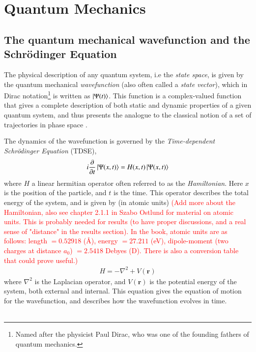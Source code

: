 \documentclass{subfiles}
\begin{document}
\section{Quantum Mechanics}
\subsection{The quantum mechanical wavefunction and the Schrödinger Equation}
The physical description of any quantum system, i.e the \emph{state space}, is given by the quantum mechanical \emph{wavefunction} (also often called a \emph{state vector})\cite{nielsen2010quantum}, which in Dirac notation\footnote{Named after the physicist Paul Dirac, who was one of the founding fathers of quantum mechanics.} is written as $\ket{\Psi(t)}$. 
This function is a complex-valued function that gives a complete description of both static and dynamic properties of a given quantum system, and thus presents the analogue to the classical notion of a set of trajectories in phase space \cite{hochstuhl2014time}. 

The dynamics of the wavefunction is governed by the \emph{Time-dependent Schrödinger Equation} (TDSE),
\begin{equation}
    i\frac{\partial}{\partial t}\ket{\Psi(x, t)} = H(x,t)\ket{\Psi(x, t)}\label{eq:tdse}
\end{equation}
where $H$ a linear hermitian operator often referred to as the \emph{Hamiltonian}. Here $x$ is the position of the particle, and $t$ is the time. 
This operator describes the total energy of the system, and is given by (in atomic units) \textcolor{red}{(Add more about the Hamiltonian, also see chapter 2.1.1 in Szabo Ostlund for material on atomic units. This is probably needed for results (to have proper discussions, and a real sense of "distance" in the results section). In the book, atomic units are as follows: length $=0.52918$ (Å), energy $=27.211$ (eV), dipole-moment (two charges at distance $a_0$) $=2.5418$ Debyes (D). There is also a conversion table that could prove useful.)}
\begin{align*}
    H = -\nabla^2 + V(\mathbf{r})
\end{align*}
where $\nabla^2$ is the Laplacian operator, and $V(\mathbf{r})$ is the potential energy of the system, both external and internal.
This equation gives the equation of motion for the wavefunction, and describes how the wavefunction evolves in time. \\ \\
\end{document}
